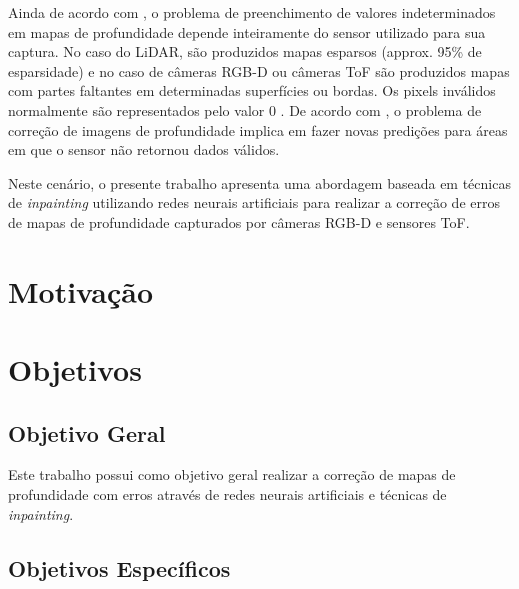 Ainda de acordo com \cite{hu2012robust}, o problema de preenchimento de valores indeterminados em mapas de profundidade depende inteiramente do sensor utilizado para sua captura. No caso do LiDAR, são produzidos mapas esparsos (approx. 95\% de esparsidade) e no caso de câmeras RGB-D ou câmeras ToF são produzidos mapas com partes faltantes em determinadas superfícies ou bordas. Os pixels inválidos normalmente são representados pelo valor 0 \cite{dourado2020multi}. De acordo com \cite{zhang2018deep}, o problema de correção de imagens de profundidade implica em fazer novas predições para áreas em que o sensor não retornou dados válidos.

Neste cenário, o presente trabalho apresenta uma abordagem baseada em técnicas de \textit{inpainting} utilizando redes neurais artificiais para realizar a correção de erros de mapas de profundidade capturados por câmeras RGB-D e sensores ToF.




     
	    
      


\section{Motivação} 

		

 
\section{Objetivos}


\subsection{Objetivo Geral}
Este trabalho possui como objetivo geral realizar a correção de mapas de profundidade com erros através de redes neurais artificiais e técnicas de \textit{inpainting}.

\subsection{Objetivos Específicos}

